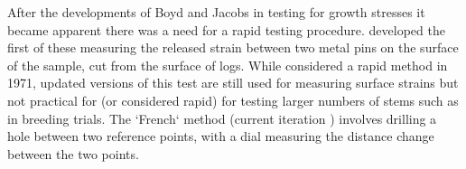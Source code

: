 After the developments of Boyd and Jacobs in testing for growth stresses it
became apparent there was a need for a rapid testing procedure. \cite{Nicholson_1971}
developed the first of these measuring the released strain between two metal pins
on the surface of the sample, cut from the surface of logs. While considered a
rapid method in 1971, updated versions of this test are still used for measuring
surface strains but not practical for (or considered rapid) for testing larger
numbers of stems such as in breeding trials. The `French` method (current
iteration \cite{Baill_res_1995}) involves drilling a hole between two reference
points, with a dial measuring the distance change between the two points.